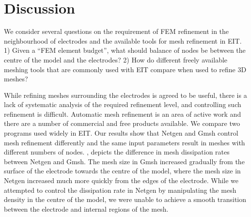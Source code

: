   
%  
%  
  
\section{Discussion}

We consider several questions on the requirement of FEM refinement in the neighbourhood of
electrodes and the available tools for mesh refinement in EIT. 
1) Given a ``FEM element budget'', what should
balance of nodes be between the centre of the model and the electrodes?
2) How do different freely available meshing tools that are
commonly used with EIT compare when used to refine 3D meshes?

While refining meshes surrounding the electrodes  is agreed to be useful,
there is a lack of systematic analysis of
the required refinement level, and controlling such
refinement is difficult. Automatic mesh refinement is an area of active work and there are
a number of commercial and free products available. We compare two programs 
used widely in EIT.
Our results show that Netgen and Gmsh control mesh refinement differently 
and the same input parameters result in meshes with different numbers of nodes. 
, depicts the difference in
mesh dissipation rates between Netgen and Gmsh. The mesh size in Gmsh increased
gradually from the surface of the electrode  towards the centre of the model,
where the mesh size in Netgen increased much more quickly from the edges of the
electrode. While we attempted to control the dissipation rate in 
Netgen by manipulating the mesh density in the centre of the model, we were unable 
to achieve a smooth transition between the electrode and internal regions of the mesh. 

